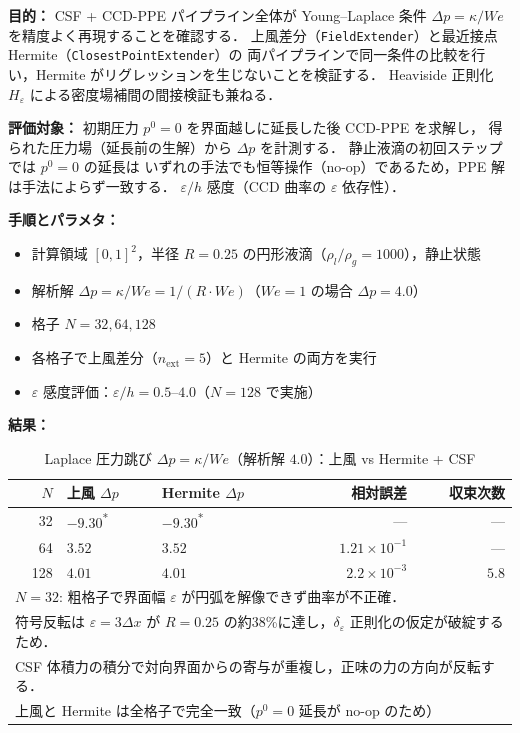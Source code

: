 \noindent\textbf{目的：}
CSF + CCD-PPE パイプライン全体が
Young--Laplace 条件 $\Delta p = \kappa/\mathit{We}$ を精度よく再現することを確認する．
上風差分（\texttt{FieldExtender}）と最近接点 Hermite（\texttt{ClosestPointExtender}）の
両パイプラインで同一条件の比較を行い，Hermite がリグレッションを生じないことを検証する．
Heaviside 正則化 $H_\varepsilon$ による密度場補間の間接検証も兼ねる．

\noindent\textbf{評価対象：}
初期圧力 $p^0 = 0$ を界面越しに延長した後 CCD-PPE を求解し，
得られた圧力場（延長前の生解）から $\Delta p$ を計測する．
静止液滴の初回ステップでは $p^0 = 0$ の延長は
いずれの手法でも恒等操作（no-op）であるため，PPE 解は手法によらず一致する．
$\varepsilon/h$ 感度（CCD 曲率の $\varepsilon$ 依存性）．

\noindent\textbf{手順とパラメタ：}
\begin{itemize}[noitemsep]
  \item 計算領域 $[0,1]^2$，半径 $R = 0.25$ の円形液滴（$\rho_l/\rho_g = 1000$），静止状態
  \item 解析解 $\Delta p = \kappa/\mathit{We} = 1/(R \cdot \mathit{We})$（$\mathit{We} = 1$ の場合 $\Delta p = 4.0$）
  \item 格子 $N = 32, 64, 128$
  \item 各格子で上風差分（$n_{\text{ext}} = 5$）と Hermite の両方を実行
  \item $\varepsilon$ 感度評価：$\varepsilon/h = 0.5$--$4.0$（$N = 128$ で実施）
\end{itemize}

\noindent\textbf{結果：}

\begin{table}[htbp]
\centering
\caption{Laplace 圧力跳び $\Delta p = \kappa/\mathit{We}$（解析解 $4.0$）：上風 vs Hermite + CSF}
\label{tab:field_extension_laplace}
\renewcommand{\arraystretch}{1.3}
\begin{tabular}{rp{1.6cm}p{1.6cm}rr}
\toprule
$N$ & 上風 $\Delta p$ & Hermite $\Delta p$ & 相対誤差 & 収束次数 \\
\midrule
 32 & $-9.30$\textsuperscript{*} & $-9.30$\textsuperscript{*} & --- & --- \\
 64 & $3.52$  & $3.52$ & $1.21 \times 10^{-1}$ & --- \\
128 & $4.01$  & $4.01$ & $2.2 \times 10^{-3}$  & $5.8$ \\
\bottomrule
\multicolumn{5}{l}{\footnotesize *$N=32$: 粗格子で界面幅 $\varepsilon$ が円弧を解像できず曲率が不正確．} \\
\multicolumn{5}{l}{\footnotesize \phantom{*}符号反転は $\varepsilon = 3\Delta x$ が $R=0.25$ の約38\%に達し，$\delta_\varepsilon$ 正則化の仮定が破綻するため．} \\
\multicolumn{5}{l}{\footnotesize \phantom{*}CSF 体積力の積分で対向界面からの寄与が重複し，正味の力の方向が反転する．} \\
\multicolumn{5}{l}{\footnotesize 上風と Hermite は全格子で完全一致（$p^0=0$ 延長が no-op のため）}
\end{tabular}
\end{table}

